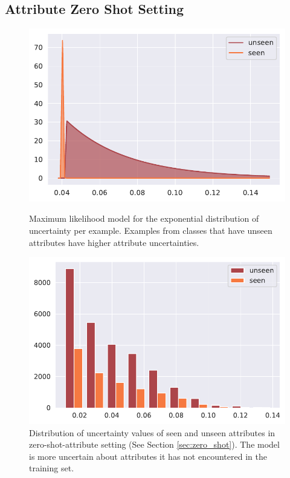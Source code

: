 \documentclass[a4paper,cleardoubleempty,BCOR1cm, 11pt]{report}
\begin{document}
\subsection{Attribute Zero Shot Setting}
\begin{figure}[t!]
	\centering
	\begin{minipage}[t]{0.45\textwidth}
		\centering
		\includegraphics[width=1\textwidth]{images/attr_zero_shot_class_uncertainty.pdf} 
		\caption{Maximum likelihood model for the exponential distribution of uncertainty per example. Examples from classes that have unseen attributes have higher attribute uncertainties.}
		\label{fig:unseen_attr_classes}
	\end{minipage}\hfill
	\begin{minipage}[t]{0.45\textwidth}
		\centering
		\includegraphics[width=1\textwidth]{images/zero_attr_class_uncertainty_hist_medians.pdf}
		\caption{Distribution of uncertainty values of seen and unseen attributes in zero-shot-attribute setting (See Section \ref{sec:zero_shot}). The model is more uncertain about attributes it has not encountered in the training set.}
		\label{fig:unseen_attrs}
	\end{minipage}
\end{figure}
\end{document}
